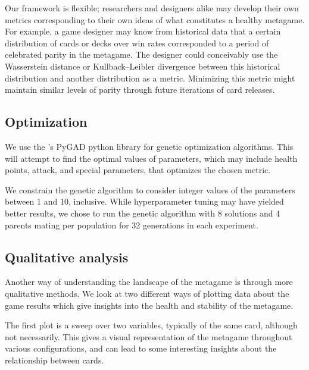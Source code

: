 Our framework is flexible; researchers and designers alike may develop their own metrics corresponding to their
own ideas of what constitutes a healthy metagame. For example, a game designer may know from historical data that
a certain distribution of cards or decks over win rates corresponded to a period of celebrated parity in the metagame. 
The designer could conceivably use the Wasserstein distance or Kullback--Leibler 
divergence between this historical distribution and another distribution as a metric. Minimizing this metric 
might maintain similar levels of parity through future iterations of card releases.

\subsection{Optimization}

We use the \citeauthor{gad2021pygad}'s  PyGAD python library for genetic optimization algorithms. This will attempt to find the optimal values of
parameters, which may include health points, attack, and special parameters, that optimizes
the chosen metric.

We constrain the genetic algorithm to consider integer values of the parameters between 1 and 10, inclusive. While hyperparameter tuning may have yielded better results,
we chose to run the genetic algorithm with 8 solutions and 4 parents mating per population for 32 generations in each experiment.

\subsection{Qualitative analysis}

Another way of understanding the landscape of the metagame is through more qualitative methods. We look at two different ways of plotting data about the game results which give insights into the health and stability of the metagame. 

The first plot is a sweep over two variables, typically of the same card, although not necessarily. This gives a visual representation of the metagame throughout various configurations, and can lead to some interesting insights about the relationship between cards.

